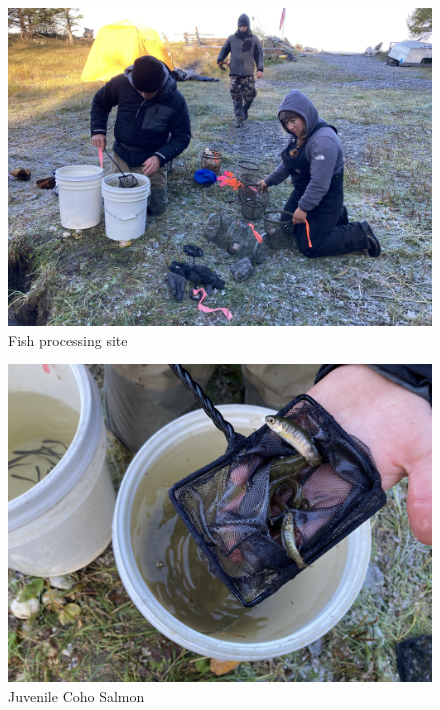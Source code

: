 \documentclass[
]{book}
\begin{document}
\begin{figure}
\centering
\includegraphics{images/fish_rescue/IMG-6271.jpg}
\caption{\label{fig:unnamed-chunk-20}Fish processing site}
\end{figure}

\begin{figure}
\centering
\includegraphics{images/fish_rescue/IMG-6272.jpg}
\caption{\label{fig:unnamed-chunk-21}Juvenile Coho Salmon}
\end{figure}
\end{document}
